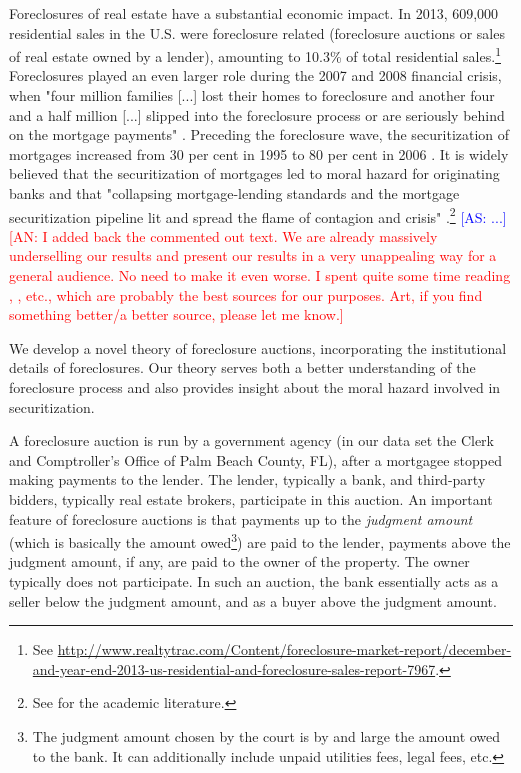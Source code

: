 \documentclass[11pt,twopage]{article}
\newcommand{\AN}[1]{\textcolor{red}{[AN: #1]}}
\newcommand{\AS}[1]{\textcolor{blue}{[AS: #1]}}
\begin{document}
Foreclosures of real estate have a substantial economic impact. In
2013, 609,000 residential sales in the U.S. were foreclosure related
(foreclosure auctions or sales of real estate owned by a lender),
amounting to 10.3\% of total residential sales.\footnote{See
  \url{http://www.realtytrac.com/Content/foreclosure-market-report/december-and-year-end-2013-us-residential-and-foreclosure-sales-report-7967}.}
Foreclosures played an even larger role during the 2007 and 2008
financial crisis, when "four million families [...] lost their homes
to foreclosure and another four and a half million [...] slipped into
the foreclosure process or are seriously behind on the mortgage
payments" \cite[Financial Crisis Inquiry Report,][p. xv]{angelides2011financial}. 
Preceding the foreclosure wave, the securitization of mortgages increased from 30 per cent in
1995 to 80 per cent in 2006 \cite[p. 19]{dewatripont2010balancing}. It is widely
believed that the securitization of mortgages led to moral hazard for originating banks and that
"collapsing mortgage-lending
standards and the mortgage securitization pipeline lit and spread the
flame of contagion and crisis" \cite[p. xxiii]{angelides2011financial}.\footnote{See
\cite{brunnermeier2009deciphering,mian2009consequences,keys2008did,tirole2011illiquidity} for the
academic literature.}
\AS{...}
\AN{I added back the commented out text. We are already massively underselling our results
and present our results in a very unappealing way for a general audience. No need
to make it even worse. I spent quite some time reading \cite{dewatripont2010balancing},
\cite{angelides2011financial}, etc., which are probably the best sources for our purposes.
Art, if you find something better/a better source, please let me know.}

We develop a novel theory of foreclosure auctions, incorporating the
institutional details of foreclosures. 
Our theory serves both a
better understanding of the foreclosure process and  also provides insight about the moral hazard involved
in securitization.

A foreclosure auction is run by a government agency (in our data set the Clerk and Comptroller's Office of Palm Beach
County, FL), after a mortgagee stopped making payments to the
lender. The lender, typically a bank, and third-party bidders,
typically real estate brokers, participate in this auction. An
important feature of foreclosure auctions is that payments up to the
\emph{judgment amount} (which is basically the amount owed\footnote{The judgment amount
chosen by the court is by and large the amount owed to the bank. It can additionally include 
unpaid utilities fees, legal fees, etc.}) are paid to the lender, payments
above the judgment amount, if any, are paid to the owner of the
property. The owner typically does not participate. In such an
auction, the bank essentially acts as a seller below the judgment
amount, and as a buyer above the judgment amount.
\end{document}
